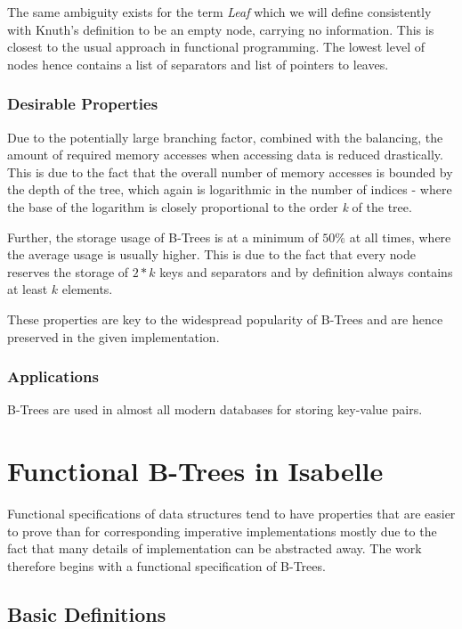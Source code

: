 The same ambiguity exists for the term \textit{Leaf} which we will define consistently with Knuth's definition \parencite{DBLP:books/lib/Knuth98a}
to be an empty node, carrying no information.
This is closest to the usual approach in functional programming.
The lowest level of nodes hence contains a list of separators and
list of pointers to leaves.


\subsection{Desirable Properties}

Due to the potentially large branching factor, combined with the balancing,
the amount of required memory accesses when accessing data is reduced drastically.
This is due to the fact that the overall number of memory accesses is bounded by the depth
of the tree, which again is logarithmic in the number of indices -
where the base of the logarithm is closely proportional to the order \textit{k} of the tree.

Further, the storage usage of B-Trees is at a minimum of $50\%$ at all times,
where the average usage is usually higher. \parencite{DBLP:journals/acta/BayerM72}
This is due to the fact that every node reserves the storage of $2*k$ keys and separators
and by definition always contains at least $k$ elements.

These properties are key to the widespread popularity of B-Trees and are
hence preserved in the given implementation.


\subsection{Applications}

B-Trees are used in almost all modern databases for storing key-value pairs.

\chapter{Functional B-Trees in Isabelle}

Functional specifications of data structures tend to have properties that
are easier to prove than for corresponding imperative implementations
mostly due to the fact that many details of implementation can be abstracted away.
The work therefore begins with a functional specification of B-Trees.

\section{Basic Definitions}

